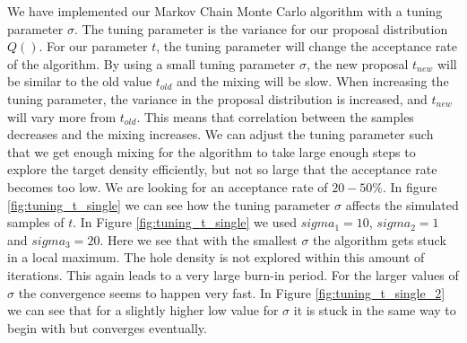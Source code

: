 We have implemented our Markov Chain Monte Carlo algorithm with a tuning parameter $\sigma$. The tuning parameter is the variance for our proposal distribution $Q()$. For our parameter $t$, the tuning parameter will change the acceptance rate of the algorithm. By using a small tuning parameter $\sigma$, the new proposal $t_{new}$ will be similar to the old value $t_{old}$ and the mixing will be slow. When increasing the tuning parameter, the variance in the proposal distribution is increased, and $t_{new}$ will vary more from $t_{old}$. This means that correlation between the samples decreases and the mixing increases. We can adjust the tuning parameter such that we get enough mixing for the algorithm to take large enough steps to explore the target density efficiently, but not so large that the acceptance rate becomes too low. We are looking for an acceptance rate of $20 - 50\%$. In figure \ref{fig:tuning_t_single} we can see how the tuning parameter $\sigma$ affects the simulated samples of $t$.  In Figure \ref{fig:tuning_t_single} we used $sigma_1 = 10$, $sigma_2 = 1$ and $sigma_3 = 20$. Here we see that with the smallest $\sigma$ the algorithm gets stuck in a local maximum. The hole density is not explored within this amount of iterations. This again leads to a very large burn-in period. For the larger values of $\sigma$ the convergence seems to happen very fast. 
In Figure \ref{fig:tuning_t_single_2} we can see that for a slightly higher low value for $\sigma$ it is stuck in the same way to begin with but converges eventually.

